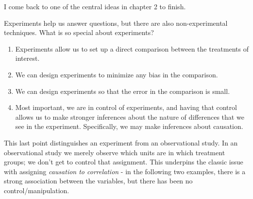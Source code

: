 \documentclass[
]{book}
\providecommand{\tightlist}{%
  \setlength{\itemsep}{0pt}\setlength{\parskip}{0pt}}
\begin{document}
I come back to one of the central ideas in chapter 2 to finish.

Experiments help us answer questions, but there are also non-experimental techniques. What is so special about experiments?

\begin{enumerate}
\def\labelenumi{\arabic{enumi}.}
\tightlist
\item
  Experiments allow us to set up a direct comparison between the treatments of interest.
\item
  We can design experiments to minimize any bias in the comparison.
\item
  We can design experiments so that the error in the comparison is small.
\item
  Most important, we are in control of experiments, and having that control allows us to make stronger inferences about the nature of differences
  that we see in the experiment. Specifically, we may make inferences about causation.
\end{enumerate}

This last point distinguishes an experiment from an observational study. In an observational study we merely observe which units are in which treatment groups; we don't get to control that assignment. This underpins the classic issue with assigning \emph{causation to correlation} - in the following two examples, there is a strong association between the variables, but there has been no control/manipulation.

  
\end{document}
